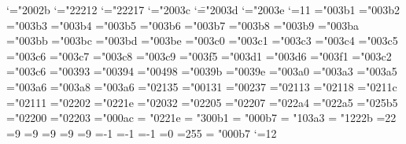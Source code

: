 \mathcode`\+="2002b
\mathcode`\-="22212
\mathcode`\*="22217
\mathcode`\<="2003c
\mathcode`\=="2003d
\mathcode`\>="2003e
%
\catcode`\@=11
%
\chardef{}
\chardef{}
\chardef{}
\chardef{}
\chardef{}
\chardef{}
\mathchardef{}
\mathchardef{}
\mathchardef{}
%
\mathchardef\alpha="003b1
\mathchardef\beta="003b2
\mathchardef\gamma="003b3
\mathchardef\delta="003b4
\mathchardef\epsilon="003b5
\mathchardef\zeta="003b6
\mathchardef\eta="003b7
\mathchardef\theta="003b8
\mathchardef\iota="003b9
\mathchardef\kappa="003ba
\mathchardef\lambda="003bb
\mathchardef\mu="003bc
\mathchardef\nu="003bd
\mathchardef\xi="003be
\mathchardef\pi="003c0
\mathchardef\rho="003c1
\mathchardef\sigma="003c3
\mathchardef\tau="003c4
\mathchardef\upsilon="003c5
\mathchardef\phi="003c6
\mathchardef\chi="003c7
\mathchardef\psi="003c8
\mathchardef\omega="003c9
\mathchardef\varepsilon="003f5
\mathchardef\vartheta="003d1
\mathchardef\varpi="003d6
\mathchardef\varrho="003f1
\mathchardef\varsigma="003c2
\mathchardef\varphi="003c6
%
\mathchardef\Gamma="00393
\mathchardef\Delta="00394
\mathchardef\Theta="00498
\mathchardef\Lambda="0039b
\mathchardef\Xi="0039e
\mathchardef\Pi="003a0
\mathchardef\Sigma="003a3
\mathchardef\Upsilon="003a5
\mathchardef\Phi="003a6
\mathchardef\Psi="003a8
\mathchardef\Omega="003a6
%
\mathchardef\aleph="02135
\mathchardef\imath="00131
\mathchardef\jmath="00237
\mathchardef\ell="02113
\mathchardef\wp="02118
\mathchardef\Re="0211c
\mathchardef\Im="02111
\mathchardef\partial="02202
\mathchardef\infty="0221e
\mathchardef\prime="02032
\mathchardef\emptyset="02205
\mathchardef\nabla="02207
\mathchardef\top="022a4
\mathchardef\bot="022a5
\mathchardef\triangle="025b5
\mathchardef\forall="02200
\mathchardef\exists="02203
\mathchardef\neg="000ac \let\lnot=\neg
\mathchardef\infty = "0221e
\mathchardef\plusminus = "300b1
\mathchardef\cdotp = "000b7
\mathchardef\sum   = "103a3
\mathchardef\intop = "1222b
%
\countdef{}
%
=22
=9
=9
=9
=9
=9
=-1
=-1
=-1
=0
=255
\countdef{}
\countdef{}
\countdef{} 
\def\newcount{\alloc@0\count\countdef\insc@unt}
\def\newdimen{\alloc@1\dimen\dimendef\insc@unt}
%
\def\alloc@#1#2#3#4#5{\global\advance\count1#1 by1
  \allocationnumber=\count1#1
  \global#3#5=\allocationnumber}
%
%
\def\int{\intop\nolimits}
\def\sqrt{\radical"2221a}
\mathchardef\cdotp = "000b7
\def\cdots{%
  \mathinner{\cdotp\cdotp\cdotp}}
%
\catcode`\@=12
